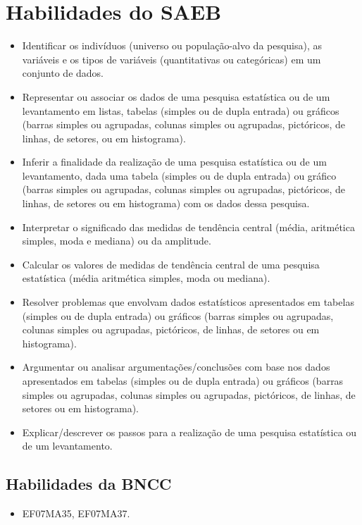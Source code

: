 \section*{Habilidades do SAEB }
\begin{itemize}
\item Identificar os indivíduos (universo ou
população-alvo da pesquisa), as variáveis e os tipos de variáveis
(quantitativas ou categóricas) em um conjunto de dados.
\item
  Representar ou associar os dados de uma pesquisa estatística ou de um
  levantamento em listas, tabelas (simples ou de dupla entrada) ou
  gráficos (barras simples ou agrupadas, colunas simples ou agrupadas,
  pictóricos, de linhas, de setores, ou em histograma).
\item
  Inferir a finalidade da realização de uma pesquisa estatística ou de
  um levantamento, dada uma tabela (simples ou de dupla entrada) ou
  gráfico (barras simples ou agrupadas, colunas simples ou agrupadas,
  pictóricos, de linhas, de setores ou em histograma) com os dados dessa
  pesquisa.
  \item
  Interpretar o significado das medidas de tendência central (média,
  aritmética simples, moda e mediana) ou da amplitude.
\item
  Calcular os valores de medidas de tendência central de uma pesquisa
  estatística (média aritmética simples, moda ou mediana).
\item
  Resolver problemas que envolvam dados estatísticos apresentados em
  tabelas (simples ou de dupla entrada) ou gráficos (barras simples ou
  agrupadas, colunas simples ou agrupadas, pictóricos, de linhas, de
  setores ou em histograma).
\item
  Argumentar ou analisar argumentações/conclusões com base nos dados
  apresentados em tabelas (simples ou de dupla entrada) ou gráficos
  (barras simples ou agrupadas, colunas simples ou agrupadas,
  pictóricos, de linhas, de setores ou em histograma).
\item
  Explicar/descrever os passos para a realização de uma pesquisa
  estatística ou de um levantamento.
\end{itemize}

\subsection{Habilidades da BNCC }
\begin{itemize}
\item EF07MA35, EF07MA37. 
\end{itemize}


